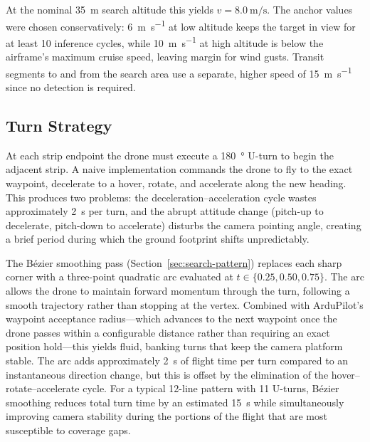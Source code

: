 \noindent At the nominal \SI{35}{\metre} search altitude this yields $v = \SI{8.0}{\metre\per\second}$.  The anchor values were chosen conservatively: \SI{6}{\metre\per\second} at low altitude keeps the target in view for at least 10 inference cycles, while \SI{10}{\metre\per\second} at high altitude is below the airframe's maximum cruise speed, leaving margin for wind gusts.  Transit segments to and from the search area use a separate, higher speed of \SI{15}{\metre\per\second} since no detection is required.

\subsection{Turn Strategy}\label{sec:turn-strategy}

At each strip endpoint the drone must execute a \SI{180}{\degree} U-turn to begin the adjacent strip.  A naive implementation commands the drone to fly to the exact waypoint, decelerate to a hover, rotate, and accelerate along the new heading.  This produces two problems: the deceleration--acceleration cycle wastes approximately \SI{2}{\second} per turn, and the abrupt attitude change (pitch-up to decelerate, pitch-down to accelerate) disturbs the camera pointing angle, creating a brief period during which the ground footprint shifts unpredictably.

The B\'{e}zier smoothing pass (Section~\ref{sec:search-pattern}) replaces each sharp corner with a three-point quadratic arc evaluated at $t \in \{0.25, 0.50, 0.75\}$.  The arc allows the drone to maintain forward momentum through the turn, following a smooth trajectory rather than stopping at the vertex.  Combined with ArduPilot's waypoint acceptance radius---which advances to the next waypoint once the drone passes within a configurable distance rather than requiring an exact position hold---this yields fluid, banking turns that keep the camera platform stable.  The arc adds approximately \SI{2}{\second} of flight time per turn compared to an instantaneous direction change, but this is offset by the elimination of the hover--rotate--accelerate cycle.  For a typical 12-line pattern with 11 U-turns, B\'{e}zier smoothing reduces total turn time by an estimated \SI{15}{\second} while simultaneously improving camera stability during the portions of the flight that are most susceptible to coverage gaps.

